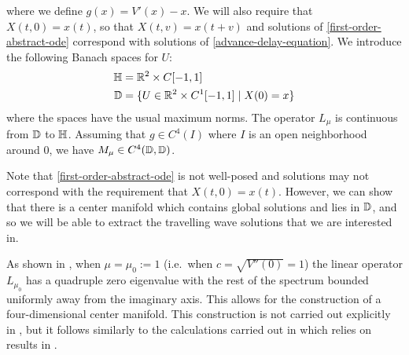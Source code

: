 where we define \(g(x)= V'(x) - x\). We will also require that \(X(t,0) = x(t)\), so that \(X(t,v) = x(t+v)\) and solutions of \cref{first-order-abstract-ode} correspond with solutions of \cref{advance-delay-equation}. We introduce the following Banach spaces for \(U\):
\begin{equation}
	\begin{aligned}
		\mathbb{H} &= \mathbb{R}^2 \times C[-1,1] \\
		\mathbb{D} &= \{U \in \mathbb{R}^2 \times C^1[-1,1] \mid X(0) = x\}
	\end{aligned}
\end{equation}
where the spaces have the usual maximum norms. The operator \(L_\mu\) is continuous from \(\mathbb{D}\) to \(\mathbb{H}\). Assuming that \(g\in C^4(I)\) where \(I\) is an open neighborhood around \(0\), we have \(M_\mu \in C^4(\mathbb{D},\mathbb{D})\).

Note that \cref{first-order-abstract-ode} is not well-posed and solutions may not correspond with the requirement that \(X(t,0) = x(t)\). However, we can show that there is a center manifold which contains global solutions and lies in \(\mathbb{D}\), and so we will be able to extract the travelling wave solutions that we are interested in.

As shown in \cite[Lem.\ 1]{iooss2000travelling}, when \(\mu = \mu_0:= 1\) (i.e.\ when \(c = \sqrt{V''(0)} = 1\)) the linear operator \(L_{\mu_0}\) has a quadruple zero eigenvalue with the rest of the spectrum bounded uniformly away from the imaginary axis. This allows for the construction of a four-dimensional center manifold. This construction is not carried out explicitly in \cite{iooss2000travelling}, but it follows similarly to the calculations carried out in \cite{iooss2000travelling2} which relies on results in \cite{vanderbauwhede1992center}.

